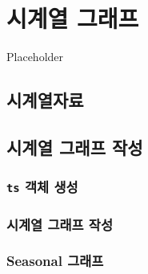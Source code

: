 \documentclass[
]{book}
\begin{document}
\hypertarget{chapter-ts-plot}{%
\chapter{시계열 그래프}\label{chapter-ts-plot}}

Placeholder

\hypertarget{uxc2dcuxacc4uxc5f4uxc790uxb8cc}{%
\section{시계열자료}\label{uxc2dcuxacc4uxc5f4uxc790uxb8cc}}

\hypertarget{uxc2dcuxacc4uxc5f4-uxadf8uxb798uxd504-uxc791uxc131}{%
\section{시계열 그래프 작성}\label{uxc2dcuxacc4uxc5f4-uxadf8uxb798uxd504-uxc791uxc131}}

\hypertarget{ts-uxac1duxccb4-uxc0dduxc131}{%
\subsection{\texorpdfstring{\texttt{ts} 객체 생성}{ts 객체 생성}}\label{ts-uxac1duxccb4-uxc0dduxc131}}

\hypertarget{section-ts-plot}{%
\subsection{시계열 그래프 작성}\label{section-ts-plot}}

\hypertarget{section-seasonal-plot}{%
\subsection{Seasonal 그래프}\label{section-seasonal-plot}}

  

\printindex
\end{document}
